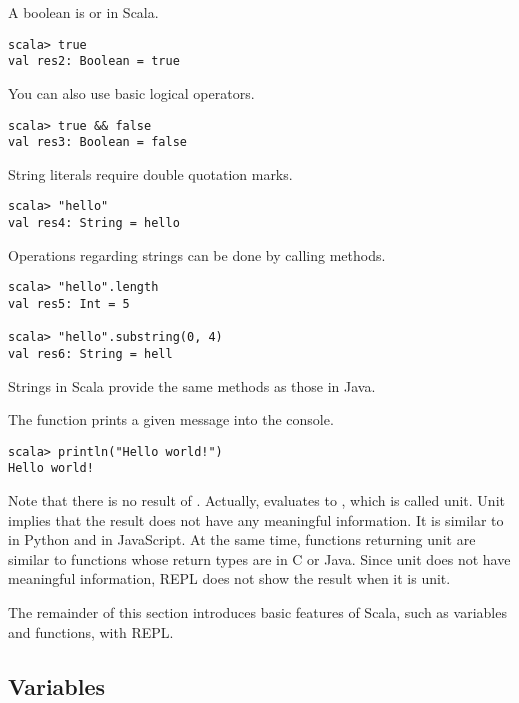 A boolean is  or  in Scala.

\begin{verbatim}
scala> true
val res2: Boolean = true
\end{verbatim}

You can also use basic logical operators.

\begin{verbatim}
scala> true && false
val res3: Boolean = false
\end{verbatim}

String literals require double quotation marks.

\begin{verbatim}
scala> "hello"
val res4: String = hello
\end{verbatim}

Operations regarding strings can be done by calling methods.

\begin{verbatim}
scala> "hello".length
val res5: Int = 5

scala> "hello".substring(0, 4)
val res6: String = hell
\end{verbatim}

Strings in Scala provide the same methods as those in
Java.

The  function prints a given message into the console.

\begin{verbatim}
scala> println("Hello world!")
Hello world!
\end{verbatim}

Note that there is no result of . Actually,
 evaluates to \code{()}, which is called unit.
Unit implies that the result does not have any meaningful information. It is
similar to  in Python and  in JavaScript. At the
same time, functions returning unit are similar to functions whose return types
are  in C or Java. Since unit does not have meaningful information,
REPL does not show the result when it is unit.

The remainder of this section introduces basic features of Scala, such as
variables and functions, with REPL.

\subsection{Variables}


